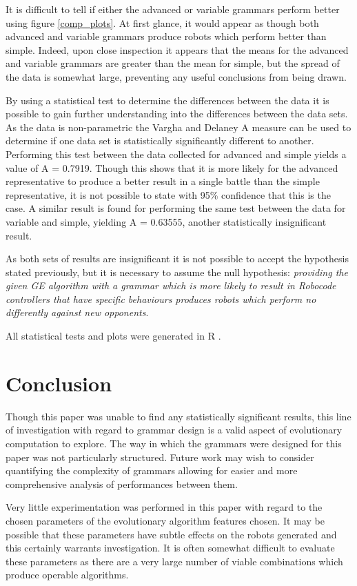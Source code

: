 \documentclass[a4paper, 12pt]{article}
\begin{document}
It is difficult to tell if either the advanced or variable grammars perform better using figure \ref{comp_plots}. At first glance, it would appear as though both advanced and variable grammars produce robots which perform better than simple.  Indeed, upon close inspection it appears that the means for the advanced and variable grammars are greater than the mean for simple, but the spread of the data is somewhat large, preventing any useful conclusions from being drawn.

By using a statistical test to determine the differences between the data it is possible to gain further understanding into the differences between the data sets. As the data is non-parametric the Vargha and Delaney A measure can be used to determine if one data set is statistically significantly different to another. Performing this test between the data collected for advanced and simple yields a value of A = 0.7919. Though this shows that it is more likely for the advanced representative to produce a better result in a single battle than the simple representative, it is not possible to state with 95\% confidence that this is the case. A similar result is found for performing the same test between the data for variable and simple, yielding A = 0.63555, another statistically insignificant result.

As both sets of results are insignificant it is not possible to accept the hypothesis stated previously, but it is necessary to assume the null hypothesis: \textit{providing the given GE algorithm with a grammar which is more likely to result in Robocode controllers that have specific behaviours produces robots which perform no differently against new opponents}.


All statistical tests and plots were generated in R \cite{r_stats}.
\section{Conclusion}
Though this paper was unable to find any statistically significant results, this line of investigation with regard to grammar design is a valid aspect of evolutionary computation to explore. The way in which the grammars were designed for this paper was not particularly structured. Future work may wish to consider quantifying the complexity of grammars allowing for easier and more comprehensive analysis of performances between them.

Very little experimentation was performed in this paper with regard to the chosen parameters of the evolutionary algorithm features chosen. It may be possible that these parameters have subtle effects on the robots generated and this certainly warrants investigation. It is often somewhat difficult to evaluate these parameters as there are a very large number of viable combinations which produce operable algorithms. 
\end{document}
